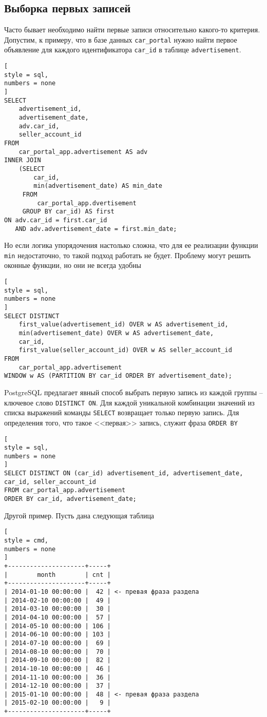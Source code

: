 \documentclass[%
	11pt,
	a4paper,
	utf8,
		]{article}
\begin{document}
\subsection{Выборка первых записей}

Часто бывает необходимо найти первые записи относительно какого-то критерия. Допустим, к примеру, что в базе данных \texttt{car\_portal} нужно найти первое объявление для каждого идентификатора \texttt{car\_id} в таблице \texttt{advertisement}.

\begin{lstlisting}[
style = sql,
numbers = none
]
SELECT
    advertisement_id,
    advertisement_date,
    adv.car_id,
    seller_account_id
FROM
    car_portal_app.advertisement AS adv
INNER JOIN
    (SELECT
        car_id,
        min(advertisement_date) AS min_date
     FROM
         car_portal_app.dvertisement
     GROUP BY car_id) AS first
ON adv.car_id = first.car_id
   AND adv.advertisement_date = first.min_date;
\end{lstlisting}

Но если логика упорядочения настолько сложна, что для ее реализации функции \texttt{min} недостаточно, то такой подход работать не будет. Проблему могут решить оконные функции, но они не всегда удобны
\begin{lstlisting}[
style = sql,
numbers = none
]
SELECT DISTINCT
    first_value(advertisement_id) OVER w AS advertisement_id,
    min(advertisement_date) OVER w AS advertisement_date,
    car_id,
    first_value(seller_account_id) OVER w AS seller_account_id
FROM
    car_portal_app.advertisement
WINDOW w AS (PARTITION BY car_id ORDER BY advertisement_date);
\end{lstlisting}

PostgreSQL предлагает явный способ выбрать первую запись из каждой группы -- ключевое слово \texttt{DISTINCT ON}. Для каждой уникальной комбинации значений из списка выражений команды \texttt{SELECT} возвращает только первую запись. Для определения того, что такое <<первая>> запись, служит фраза \texttt{ORDER BY}

\begin{lstlisting}[
style = sql,
numbers = none
]
SELECT DISTINCT ON (car_id) advertisement_id, advertisement_date, car_id, seller_account_id
FROM car_portal_app.advertisement
ORDER BY car_id, advertisement_date;
\end{lstlisting}

Другой пример. Пусть дана следующая таблица
\begin{lstlisting}[
style = cmd,
numbers = none
]
+---------------------+-----+
|        month        | cnt |
+---------------------+-----+
| 2014-01-10 00:00:00 |  42 | <- превая фраза раздела
| 2014-02-10 00:00:00 |  49 |
| 2014-03-10 00:00:00 |  30 |
| 2014-04-10 00:00:00 |  57 |
| 2014-05-10 00:00:00 | 106 |
| 2014-06-10 00:00:00 | 103 |
| 2014-07-10 00:00:00 |  69 |
| 2014-08-10 00:00:00 |  70 |
| 2014-09-10 00:00:00 |  82 |
| 2014-10-10 00:00:00 |  46 |
| 2014-11-10 00:00:00 |  36 |
| 2014-12-10 00:00:00 |  37 |
| 2015-01-10 00:00:00 |  48 | <- превая фраза раздела
| 2015-02-10 00:00:00 |   9 |
+---------------------+-----+
\end{lstlisting}
\end{document}
